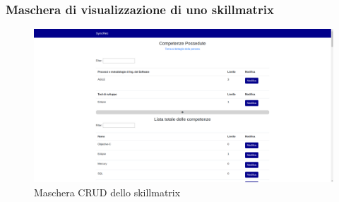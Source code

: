 \subsubsection{Maschera di visualizzazione di uno skillmatrix}\label{section:skillmatrix}
\begin{figure}[!h] 
	\centering 
	\includegraphics[width=1\columnwidth]{immagini/svil/skillmatrix} 
	\caption{Maschera CRUD dello skillmatrix}
	\label{figura:skillmatrix}
\end{figure}
